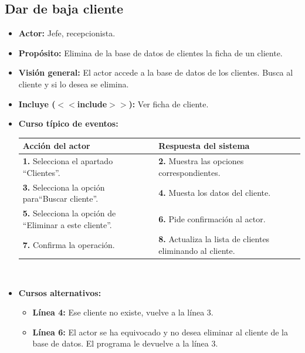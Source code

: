 \documentclass[spanish,a4paper,11pt, twoside]{report}	%
\begin{document}
	\subsection{Dar de baja cliente} 
			\begin{itemize}
			\item \textbf{Actor:} Jefe, recepcionista.
			\item \textbf{Propósito:} Elimina de la base de datos de clientes la ficha de un cliente.
			\item \textbf{Visión general:} El actor accede a la base de datos de los
				clientes.  Busca al cliente y si lo desea se elimina.
  			\item \textbf{Incluye ($<<$include$>>$):} Ver ficha de cliente.
			\item \textbf{Curso típico de eventos:} 	\\
				\begin{tabular}{|p{6cm}||p{6cm}|}
					\hline
					\textbf{Acción del actor} & \textbf{Respuesta del sistema} \\ \hline \hline
					\textbf{1.} Selecciona el apartado ``Clientes''. & 
					\textbf{2.} Muestra las opciones correspondientes. \\ \hline
					\textbf{3.} Selecciona la opción para``Buscar cliente''.	& 
					\textbf{4.} Muesta los datos del cliente. \\ \hline
					\textbf{5.} Selecciona la opción de ``Eliminar a este cliente''. & 
					\textbf{6.} Pide confirmación al actor.\\ \hline
					\textbf{7.} Confirma la operación. & 
					\textbf{8.} Actualiza la lista de clientes eliminando al cliente. \\ \hline
				\end{tabular}
			\\
			\item \textbf{Cursos alternativos:} 
			\begin{itemize}
				\item  \textbf{Línea 4:} Ese cliente no existe, vuelve a la línea 3.
				\item  \textbf{Línea 6:} El actor se ha equivocado y no desea eliminar al cliente de la base de datos. 
					El programa le devuelve a la línea 3.
			\end {itemize}
		\end{itemize}

\end{document}
